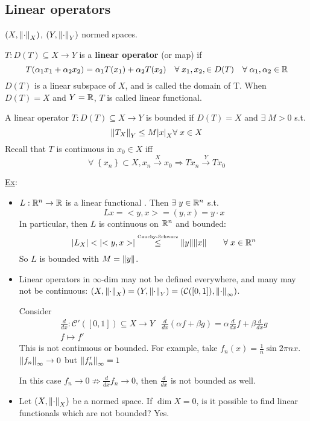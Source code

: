 \subsection*{Linear operators}
\((X, \norm{\cdot}_X)\), \((Y, \norm{\cdot}_Y)\) normed spaces.
\begin{definition}
    \(T : D(T) \subseteq X \to Y\) is a \textbf{linear operator} (or map) if 
    \[
        T(\alpha_1 x_1 + \alpha_2 x_2) = \alpha_1 T(x_1) + \alpha_2 T(x_2) \quad \forall \; x_1, x_2, \in D(T) \quad \forall \; \alpha_1, \alpha_2 \in \mathbb{R}
    \]
    \(D(T)\) is a linear subspace of \(X\), and is called the domain of T. When \(D(T) = X\) and \(Y = \mathbb{R}\), \(T\) is called linear functional.
\end{definition}
\begin{definition}
    A linear operator \(T : D(T) \subseteq X \to Y\) is bounded if \(D(T) = X\) and \(\exists \; M >0\) s.t. 
    \[
        \norm{T_X}_Y \leq M \abs{x}_X \forall \; x \in X
    \]
    Recall that \(T\) is continuous in \(x_0 \in X\) iff 
    \[
        \forall \; \left\{ x_n \right\} \subset X, x_n \overset{X}{\to} x_0 \Rightarrow Tx_n \overset{Y}{\to} Tx_0
    \]
\end{definition}
\noindent\underline{Ex}:
\begin{itemize}
    \item \(L: \mathbb{R}^n \to \mathbb{R}\)  is a linear functional . Then \(\exists \; y \in \mathbb{R}^n\) s.t. 
    \[
        Lx = <y, x> = (y, x) = y \cdot x
    \]
    In particular, then \(L\) is continuous on \(\mathbb{R}^n\) and bounded:
    \[
        \abs{L_X} < \abs{<y,x>} \overset{\text{\tiny{Cauchy-Schwarz}}}{\leq} \norm{y} \norm{x} \qquad \forall\; x \in \mathbb{R}^n
    \]
    So \(L\) is bounded with \(M=\norm{y}\).

    \item Linear operators in \(\infty\)-dim may not be defined everywhere, and many may not be continuous:
    \((X, \norm{\cdot}_X) = (Y, \norm{\cdot}_Y) = (\mathcal{C}([0, 1]), \norm{\cdot}_\infty)\).
    
    Consider 
    \[
        \begin{array}{cc}
            \frac{d}{dx}: \mathcal{C}'([0,1]) \subseteq X \to Y & \frac{d}{dx}(\alpha f + \beta g) = \alpha \frac{d}{dx}f + \beta \frac{d}{dx} g \\
            f \mapsto f'
        \end{array}
    \]
    This is not continuous or bounded. For example, take \(f_n(x) = \frac{1}{n} \sin{2\pi n x}\). \(\norm{f_n}_\infty \to 0\) but \(\norm{f_n'}_\infty =1\)

    In this case \(f_n \to 0 \nRightarrow \frac{d}{dx} f_n \to 0\), then \(\frac{d}{dx} \) is not bounded as well.
    \item Let \((X, \norm{\cdot}_X)\) be a normed space. If \(\dim X = 0\), is it possible to find linear functionals which are not bounded? Yes.
\end{itemize}
